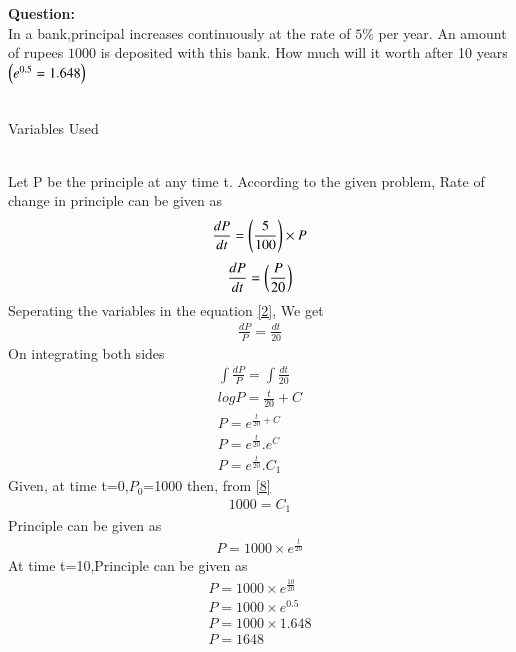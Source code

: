 \documentclass[journal]{IEEEtran}
\begin{document}
\textbf{Question:} \\
In a bank,principal increases continuously at the rate of $5\%$ per year. An amount of rupees $1000$ is deposited with this bank. How much will it worth after 10 years $\left(e^{0.5} = 1.648\right)$ \\ \\
\solution 
\begin{table}[h!]
    \centering
    
    \caption{Variables Used}
    
\end{table}
\\
\solution Let P be the principle at any time t. According to the given problem, Rate of change in principle can be given as 
\begin{align}
\frac{dP}{dt} = \left(\frac{5}{100}\right) \times P \label{1}
\end{align}
\begin{align}
\frac{dP}{dt} = \left(\frac{P}{20}\right) \label{2}
\end{align}
Seperating the variables in the equation \eqref{2}, We get 
\begin{align}
\frac{dP}{P}=\frac{dt}{20} \label{3}
\end{align}
On integrating both sides
\begin{align}
\int \frac{dP}{P}=\int \frac{dt}{20} \label{4} \\
log P = \frac{t}{20}+C \label{5} \\
P=e^{\frac{t}{20}+C} \label{6} \\
P=e^{\frac{t}{20}} . e^{C} \label{7} \\
P=e^{\frac{t}{20}} . C_1 \label{8}
\end{align}
Given, at time t=0,$P_0$=1000 then, from \eqref{8}
\begin{align}
1000=C_1 \label{9}
\end{align}
Principle can be given as 
\begin{align}
P = 1000 \times e^{\frac{t}{20}} \label{10}
\end{align}
At time t=10,Principle can be given as \\
\begin{align}
P =1000 \times e^{\frac{10}{20}} \\
P =1000 \times e^{0.5} \\
P = 1000 \times 1.648 \\
P = 1648
\end{align}
\end{document}
